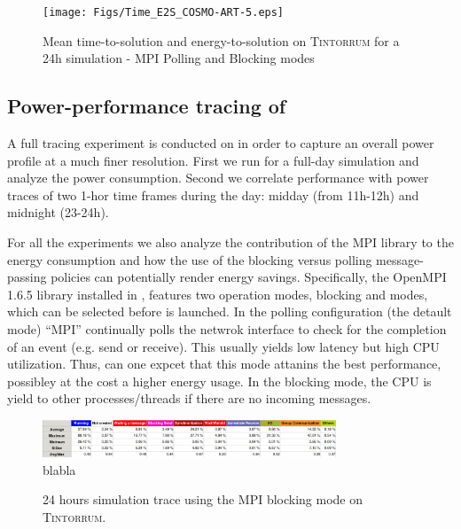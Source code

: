 \begin{figure}[htbf]
  \texttt{[image: Figs/Time\_E2S\_COSMO-ART-5.eps]}
  \caption{Mean time-to-solution and energy-to-solution on
    \textsc{Tintorrum} for a 24h simulation - MPI Polling and Blocking
    modes}
  \label{fig:4}
\end{figure}

\subsection{Power-performance tracing of \cosmoart}
\label{subsec:4.3}

A full tracing experiment is conducted on \tinto in order to capture an overall power
profile at a much finer resolution. First we run \cosmoart for a full-day simulation
and analyze the power consumption. Second we correlate performance with
power traces of two 1-hor time frames during the day: midday (from 11h-12h) and
midnight (23-24h).

For all the experiments we also analyze the contribution of the MPI library to the energy consumption and how the use of the blocking versus polling message-passing policies can potentially render energy savings. Specifically, the OpenMPI 1.6.5 library installed in \tinto, features two operation modes, blocking and modes, which can be selected before \cosmoart is launched. In the polling configuration (the detault mode) ``MPI'' continually polls
the netwrok interface to check for the completion of an event (e.g. send or receive).
This usually yields low latency but high CPU utilization. Thus, can one expcet that this mode attanins the best performance, possibley at the cost a higher energy usage. In the blocking
mode, the CPU is yield to other processes/threads if there are no incoming messages.




\begin{figure}[htbf]
  \centering
  \includegraphics[width=0.78\textwidth]{Figs/23_24_blq1_stat1.eps}
  \caption{blabla}
  \label{fig:8}
\end{figure}

\begin{figure}[htbf]
  \centering
  \scalebox{0.5}{}
  \caption{24 hours simulation trace using the MPI blocking mode on
    \textsc{Tintorrum}.}
  \label{fig:9}
\end{figure}

